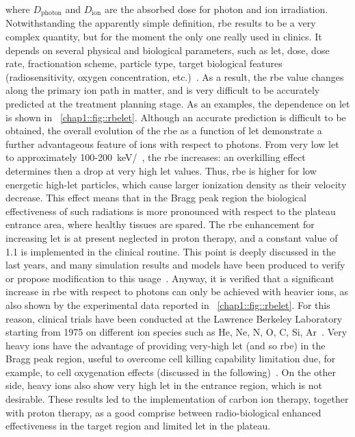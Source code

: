 where $D_{\mathrm{photon}}$ and $D_{\mathrm{ion}}$ are the absorbed dose for photon and ion irradiation. Notwithstanding the apparently simple definition, \gls{rbe} results to be a very complex quantity, but for the moment the only one really used in clinics. It depends on several physical and biological parameters, such as \gls{let}, dose, dose rate, fractionation scheme, particle type, target biological features (radiosensitivity, oxygen concentration, etc.)~\parencite{Durante2009}. As a result, the \gls{rbe} value changes along the primary ion path in matter, and is very difficult to be accurately predicted at the treatment planning stage. As an examples, the dependence on \gls{let} is shown in \figurename~\ref{chap1::fig::rbelet}.  Although an accurate prediction is difficult to be obtained, the overall evolution of the \gls{rbe} as a function of \gls{let} demonstrate a further advantageous feature of ions with respect to photons. From very low \gls{let} to approximately 100-200~keV/\charmum ~, the \gls{rbe} increases: an overkilling effect determines then a drop at very high \gls{let} values. Thus, \gls{rbe} is higher for low energetic high-\gls{let} particles, which cause larger ionization density as their velocity decrease. This effect means that in the Bragg peak region the biological effectiveness of such radiations is more pronounced with respect to the plateau entrance area, where healthy tissues are spared. The \gls{rbe} enhancement for increasing \gls{let} is at present neglected in proton therapy, and a constant value of 1.1 is implemented in the clinical routine. This point is deeply discussed in the last years, and many simulation results and models have been produced to verify or propose modification to this usage~\parencite{Giantsoudi2013, Sethi2014, Guan2015, Jones2015, McNamara2015, Giovannini2016}. Anyway,  it is verified that a significant increase in \gls{rbe} with respect to photons can only be achieved with heavier ions, as also shown by the experimental data reported in \figurename~\ref{chap1::fig::rbelet}. For this reason, clinical trials have been conducted at the Lawrence Berkeley Laboratory starting from 1975 on different ion species such as He, Ne, N, O, C, Si, Ar~\parencite{Castro1995}. Very heavy ions have the advantage of providing very-high \gls{let} (and so \gls{rbe}) in the Bragg peak region, useful to overcome cell killing capability limitation due, for example, to cell oxygenation effects (discussed in the following)~\parencite{Blakely1984}. On the other side, heavy ions also show very high \gls{let} in the entrance region, which is not desirable. These results led to the implementation of carbon ion therapy, together with proton therapy, as a good comprise between radio-biological enhanced effectiveness in the target region and limited \gls{let} in the plateau. 
